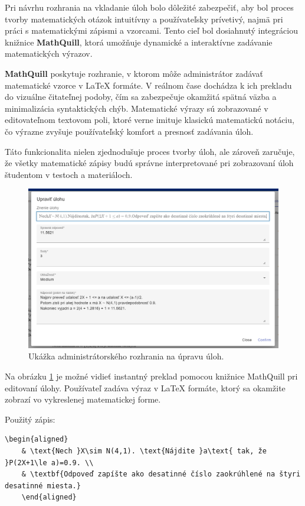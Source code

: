 Pri návrhu rozhrania na vkladanie úloh bolo dôležité zabezpečiť, aby bol proces tvorby matematických otázok intuitívny a používateľsky prívetivý, najmä pri práci s matematickými zápismi a vzorcami.
 Tento cieľ bol dosiahnutý integráciou knižnice \textbf{MathQuill}, ktorá umožňuje dynamické a interaktívne zadávanie matematických výrazov.

\textbf{MathQuill} poskytuje rozhranie, v ktorom môže administrátor zadávať matematické vzorce v LaTeX formáte. 
V reálnom čase dochádza k ich prekladu do vizuálne čitateľnej podoby, čím sa zabezpečuje okamžitá spätná väzba a minimalizácia syntaktických chýb.
 Matematické výrazy sú zobrazované v editovateľnom textovom poli, ktoré verne imituje klasickú matematickú notáciu, čo výrazne zvyšuje používateľský komfort a presnosť zadávania úloh.

Táto funkcionalita nielen zjednodušuje proces tvorby úloh, ale zároveň zaručuje, že všetky matematické zápisy budú správne interpretované pri zobrazovaní úloh študentom v testoch a materiáloch.

\begin{figure}[H]
  \centering
  \includegraphics[width=14cm]{img/edit_ulohy.png}
  \caption{Ukážka administrátorského rozhrania na úpravu úloh.}
  \label{fig:admin_edit}
\end{figure}

Na obrázku \ref{fig:admin_edit} je možné vidieť instantný preklad pomocou knižnice MathQuill pri editovaní úlohy. Používateľ zadáva výraz v LaTeX formáte, ktorý sa okamžite zobrazí vo vykreslenej matematickej forme.

Použitý zápis:
\begin{lstlisting}[style=code-listing, caption={LaTeX zápis matematického výrazu}]
\begin{aligned}
    & \text{Nech }X\sim N(4,1). \text{Nájdite }a\text{ tak, že }P(2X+1\le a)=0.9. \\
    & \textbf{Odpoveď zapíšte ako desatinné číslo zaokrúhlené na štyri desatinné miesta.}
    \end{aligned}  \end{lstlisting}
  

